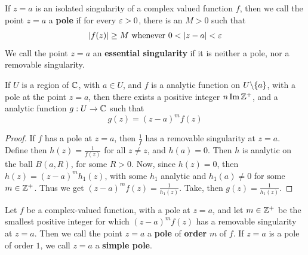 \begin{definition}
    If $z=a$ is an isolated singularity of a complex valued function $f$, then
    we call the point $z=a$ a  \textbf{pole} if for every $\varepsilon>0$, there is an
    $M>0$ such that
    \begin{equation*}
        |f(z)| \geq M \text{ whenever } 0<|z-a|<\e
    \end{equation*}
    We call the point $z=a$ an \textbf{essential singularity} if it is neither a
    pole, nor a removable singularity.
\end{definition}

\begin{lemma}\label{5.1.2}
    If $U$ is a region of  $\mathbb{C}$, with  $a \in U$, and  $f$ is a analytic
    function on  $U \backslash \{a\}$, with a pole at the point $z=a$, then there
    exists a positive integer  $n \operatorname{Im} \mathbb{Z}^+$, and a analytic function  $g:U
    \xrightarrow{} \mathbb{C}$ such that
    \begin{equation*}
        g(z)=(z-a)^mf(z)
    \end{equation*}
\end{lemma}
\begin{proof}
    If $f$ has a pole at  $z=a$, then  $\frac{1}{f}$ has a removable singularity
    at $z=a$. Define then  $h(z)=\frac{1}{f(z)}$ for all $z \neq z$, and
    $h(a)=0$. Then $h$ is analytic on the ball  $B(a,R)$, for some $R>0$.
    Now, since  $h(z)=0$, then $h(z)=(z-a)^mh_1(z)$, with some $h_1$ analytic
    and $h_1(a) \neq 0$ for some $m \in \mathbb{Z}^+$. Thus we get
    $(z-a)^mf(z)=\frac{1}{h_1(z)}$. Take, then $g(z)=\frac{1}{h_1(z)}$.
\end{proof}

\begin{definition}
    Let $f$ be a complex-valued function, with a pole at  $z=a$, and let  $m \in
    \mathbb{Z}^+$ be the smallest positive integer for which  $(z-a)^mf(z)$ has a
    removable singularity at $z=a$. Then we call the point $z=a$ a
    \textbf{pole} of \textbf{order} $m$ of  $f$. If $z=a$ is a pole of order
    $1$, we call $z=a$ a \textbf{simple pole}.
\end{definition}

